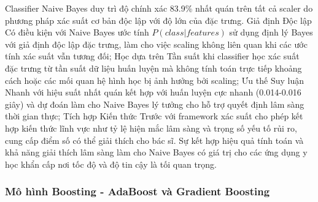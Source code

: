 Classifier Naive Bayes duy trì độ chính xác 83.9\% nhất quán trên tất cả scaler do phương pháp xác suất cơ bản độc lập với độ lớn của đặc trưng. Giả định Độc lập Có điều kiện với Naive Bayes ước tính $P(class|features)$ sử dụng định lý Bayes với giả định độc lập đặc trưng, làm cho việc scaling không liên quan khi các ước tính xác suất vẫn tương đối; Học dựa trên Tần suất khi classifier học xác suất đặc trưng từ tần suất dữ liệu huấn luyện mà không tính toán trực tiếp khoảng cách hoặc các mối quan hệ hình học bị ảnh hưởng bởi scaling; Ưu thế Suy luận Nhanh với hiệu suất nhất quán kết hợp với huấn luyện cực nhanh (0.014-0.016 giây) và dự đoán làm cho Naive Bayes lý tưởng cho hỗ trợ quyết định lâm sàng thời gian thực; Tích hợp Kiến thức Trước với framework xác suất cho phép kết hợp kiến thức lĩnh vực như tỷ lệ hiện mắc lâm sàng và trọng số yếu tố rủi ro, cung cấp điểm số có thể giải thích cho bác sĩ. Sự kết hợp hiệu quả tính toán và khả năng giải thích lâm sàng làm cho Naive Bayes có giá trị cho các ứng dụng y học khẩn cấp nơi tốc độ và độ tin cậy là tối quan trọng.

\subsubsection{Mô hình Boosting - AdaBoost và Gradient Boosting}

